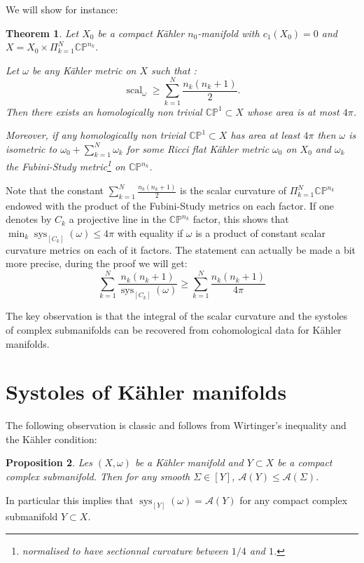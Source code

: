 \documentclass{amsart}
\newtheorem{theorem}{Theorem}[section]
\newtheorem{proposition}[theorem]{Proposition}
\numberwithin{equation}{section}
\theoremstyle{definition}
\DeclareMathOperator{\scal}{scal}
\DeclareMathOperator{\sys}{sys}
\begin{document}
We will show for instance:

\begin{theorem}\label{thm_prod_proj}
    Let $X_0$ be a compact K\"ahler $n_0$-manifold
    with $c_1(X_0)=0$ %
    and $X=X_0\times\Pi_{k=1}^N\mathbb{CP}^{n_k}$. %

    Let $\omega$ be any K\"ahler metric on $X$ such that :
    \[\scal_\omega\geq \sum_{k=1}^N \frac{n_k(n_k+1)}{2}.\]
    Then there exists an homologically non trivial $\mathbb{CP}^1\subset X$ whose area is at most $4\pi$.

    Moreover, if any homologically non trivial $\mathbb{CP}^1\subset X$ has area at least $4\pi$ then $\omega$ is isometric to $\omega_0+\sum_{k=1}^N\omega_k$ for some Ricci flat K\"ahler metric $\omega_0$ on $X_0$ and $\omega_k$ the Fubini-Study metric\footnote{normalised to have sectionnal curvature between $1/4$ and $1$.} on $\mathbb{CP}^{n_k}$.
\end{theorem}

Note that the constant $\sum_{k=1}^N \frac{n_k(n_k+1)}{2}$ is the scalar curvature of $\Pi_{k=1}^N\mathbb{CP}^{n_k}$ endowed with the product of the Fubini-Study metrics on each factor.
If one denotes by $C_k$ a projective line in the $\mathbb{CP}^{n_k}$ factor, this shows that $\min_k\sys_{[C_k]}(\omega)\leq 4\pi$ with equality if $\omega$ is a product of constant scalar curvature metrics on each of it factors. The statement can actually be made a bit more precise, during the proof we will get:
\[\sum_{k=1}^N\frac{n_k(n_k+1)}{\sys_{[C_k]}(\omega)}\geq \sum_{k=1}^N \frac{n_k(n_k+1)}{4\pi}\]

The key observation is that the integral of the scalar curvature and the systoles of complex submanifolds can be recovered from cohomological data for K\"ahler manifolds.


\section{Systoles of K\"ahler manifolds}

The following observation is classic and follows from Wirtinger's inequality and the K\"ahler condition:
\begin{proposition}
    Les $(X,\omega)$ be a K\"ahler manifold and $Y\subset X$ be a compact complex submanifold. Then for any smooth $\Sigma\in [Y]$, $\mathcal{A}(Y)\leq\mathcal{A}(\Sigma)$.
\end{proposition}
In particular this implies that $\sys_{[Y]}(\omega)=\mathcal{A}(Y)$ for any compact complex submanifold $Y\subset X$.
\end{document}
